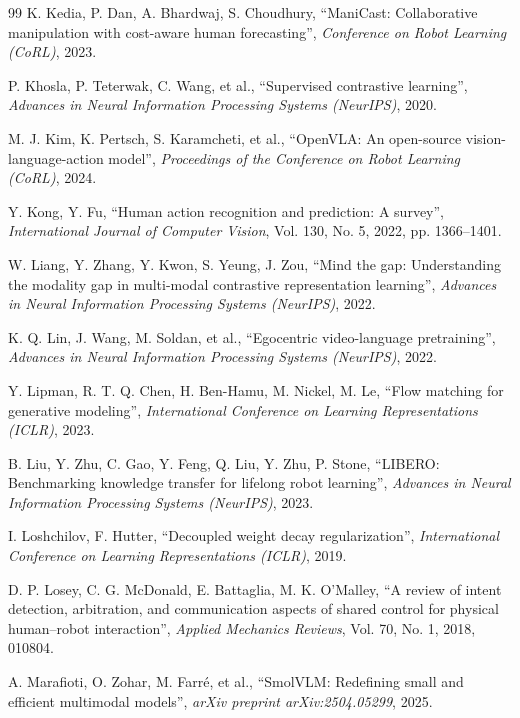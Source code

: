 \documentclass[a4paper,oneside]{report}
\begin{document}
{\begin{thebibliography}{99}
K. Kedia, P. Dan, A. Bhardwaj, S. Choudhury, ``ManiCast: Collaborative manipulation with cost-aware human forecasting'', \emph{Conference on Robot Learning (CoRL)}, 2023.

P. Khosla, P. Teterwak, C. Wang, et al., ``Supervised contrastive learning'', \emph{Advances in Neural Information Processing Systems (NeurIPS)}, 2020.

M. J. Kim, K. Pertsch, S. Karamcheti, et al., ``OpenVLA: An open-source vision-language-action model'', \emph{Proceedings of the Conference on Robot Learning (CoRL)}, 2024.

Y. Kong, Y. Fu, ``Human action recognition and prediction: A survey'', \emph{International Journal of Computer Vision}, Vol. 130, No. 5, 2022, pp. 1366--1401.

W. Liang, Y. Zhang, Y. Kwon, S. Yeung, J. Zou, ``Mind the gap: Understanding the modality gap in multi-modal contrastive representation learning'', \emph{Advances in Neural Information Processing Systems (NeurIPS)}, 2022.

K. Q. Lin, J. Wang, M. Soldan, et al., ``Egocentric video-language pretraining'', \emph{Advances in Neural Information Processing Systems (NeurIPS)}, 2022.

Y. Lipman, R. T. Q. Chen, H. Ben-Hamu, M. Nickel, M. Le, ``Flow matching for generative modeling'', \emph{International Conference on Learning Representations (ICLR)}, 2023.

B. Liu, Y. Zhu, C. Gao, Y. Feng, Q. Liu, Y. Zhu, P. Stone, ``LIBERO: Benchmarking knowledge transfer for lifelong robot learning'', \emph{Advances in Neural Information Processing Systems (NeurIPS)}, 2023.

I. Loshchilov, F. Hutter, ``Decoupled weight decay regularization'', \emph{International Conference on Learning Representations (ICLR)}, 2019.

D. P. Losey, C. G. McDonald, E. Battaglia, M. K. O'Malley, ``A review of intent detection, arbitration, and communication aspects of shared control for physical human--robot interaction'', \emph{Applied Mechanics Reviews}, Vol. 70, No. 1, 2018, 010804.

A. Marafioti, O. Zohar, M. Farr\'e, et al., ``SmolVLM: Redefining small and efficient multimodal models'', \emph{arXiv preprint arXiv:2504.05299}, 2025.


\end{thebibliography}}
\end{document}
